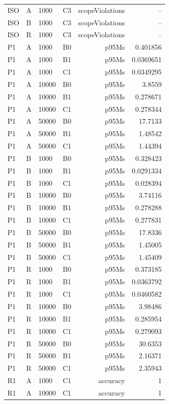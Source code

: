\begin{longtable}{llllrr}
ISO & A & 1000 & C3 & scopeViolations & -- \\
ISO & B & 1000 & C3 & scopeViolations & -- \\
ISO & R & 1000 & C3 & scopeViolations & -- \\
P1 & A & 1000 & B0 & p95Ms & 0.401856 \\
P1 & A & 1000 & B1 & p95Ms & 0.0369651 \\
P1 & A & 1000 & C1 & p95Ms & 0.0349295 \\
P1 & A & 10000 & B0 & p95Ms & 3.8559 \\
P1 & A & 10000 & B1 & p95Ms & 0.278671 \\
P1 & A & 10000 & C1 & p95Ms & 0.278344 \\
P1 & A & 50000 & B0 & p95Ms & 17.7133 \\
P1 & A & 50000 & B1 & p95Ms & 1.48542 \\
P1 & A & 50000 & C1 & p95Ms & 1.44394 \\
P1 & B & 1000 & B0 & p95Ms & 0.328423 \\
P1 & B & 1000 & B1 & p95Ms & 0.0291334 \\
P1 & B & 1000 & C1 & p95Ms & 0.028394 \\
P1 & B & 10000 & B0 & p95Ms & 3.74116 \\
P1 & B & 10000 & B1 & p95Ms & 0.278288 \\
P1 & B & 10000 & C1 & p95Ms & 0.277831 \\
P1 & B & 50000 & B0 & p95Ms & 17.8336 \\
P1 & B & 50000 & B1 & p95Ms & 1.45005 \\
P1 & B & 50000 & C1 & p95Ms & 1.45409 \\
P1 & R & 1000 & B0 & p95Ms & 0.373185 \\
P1 & R & 1000 & B1 & p95Ms & 0.0363792 \\
P1 & R & 1000 & C1 & p95Ms & 0.0460582 \\
P1 & R & 10000 & B0 & p95Ms & 3.98486 \\
P1 & R & 10000 & B1 & p95Ms & 0.285954 \\
P1 & R & 10000 & C1 & p95Ms & 0.279093 \\
P1 & R & 50000 & B0 & p95Ms & 30.6353 \\
P1 & R & 50000 & B1 & p95Ms & 2.16371 \\
P1 & R & 50000 & C1 & p95Ms & 2.35943 \\
R1 & A & 1000 & C1 & accuracy & 1 \\
R1 & A & 10000 & C1 & accuracy & 1 \\

\end{longtable}
